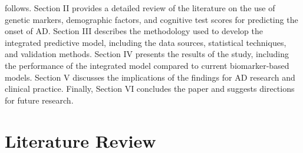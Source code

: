 \documentclass[conference]{IEEEtran}
\begin{document}
follows. Section II provides a detailed review of the literature on the use of genetic markers, demographic factors, and cognitive test scores for predicting the onset of AD. Section III describes the methodology used to develop the integrated predictive model, including the data sources, statistical techniques, and validation methods. Section IV presents the results of the study, including the performance of the integrated model compared to current biomarker-based models. Section V discusses the implications of the findings for AD research and clinical practice. Finally, Section VI concludes the paper and suggests directions for future research.

\section{Literature Review}
\end{document}
